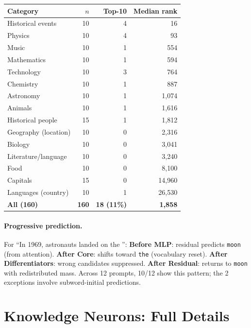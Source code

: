 \documentclass{article}
\begin{document}
\begin{table}[h]
\vspace{4pt}
\begin{tabular}{@{}lrrr@{}}
\toprule
Category & $n$ & Top-10 & Median rank \\
\midrule
Historical events  & 10 & 4 & 16 \\
Physics            & 10 & 4 & 93 \\
Music              & 10 & 1 & 554 \\
Mathematics        & 10 & 1 & 594 \\
Technology         & 10 & 3 & 764 \\
Chemistry          & 10 & 1 & 887 \\
Astronomy          & 10 & 1 & 1{,}074 \\
Animals            & 10 & 1 & 1{,}616 \\
Historical people  & 15 & 1 & 1{,}812 \\
Geography (location) & 10 & 0 & 2{,}316 \\
Biology            & 10 & 0 & 3{,}041 \\
Literature/language & 10 & 0 & 3{,}240 \\
Food               & 10 & 0 & 8{,}100 \\
Capitals           & 15 & 0 & 14{,}960 \\
Languages (country) & 10 & 1 & 26{,}530 \\
\midrule
\textbf{All (160)} & \textbf{160} & \textbf{18 (11\%)} & \textbf{1{,}858} \\
\bottomrule
\end{tabular}
\end{table}

\paragraph{Progressive prediction.}
For ``In 1969, astronauts landed on the \underline{\hspace{1cm}}'':
\textbf{Before MLP}: residual predicts \texttt{moon} (from attention).
\textbf{After Core}: shifts toward \texttt{the} (vocabulary reset).
\textbf{After Differentiators}: wrong candidates suppressed.
\textbf{After Residual}: returns to \texttt{moon} with redistributed mass.
Across 12 prompts, 10/12 show this pattern; the 2 exceptions involve
subword-initial predictions.

\section{Knowledge Neurons: Full Details}
\label{app:knowledge_neurons}
\end{document}
